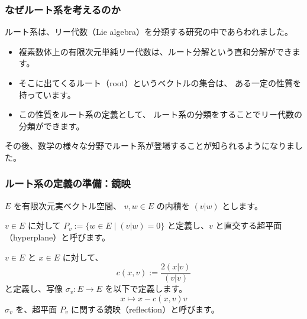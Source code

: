\documentclass{beamer}
\begin{document}
\begin{frame}
    \frametitle{なぜルート系を考えるのか}

    ルート系は、リー代数（Lie algebra）を分類する研究の中であらわれました。

    \begin{itemize}
        \item 複素数体上の有限次元単純リー代数は、ルート分解という直和分解ができます。
        \item そこに出てくるルート（root）というベクトルの集合は、
              ある一定の性質を持っています。
        \item この性質をルート系の定義として、
              ルート系の分類をすることでリー代数の分類ができます。
    \end{itemize}

    その後、数学の様々な分野でルート系が登場することが知られるようになりました。
\end{frame}

\begin{frame}
    \frametitle{ルート系の定義の準備：鏡映}

    \(E\) を有限次元実ベクトル空間、
    \(v, w \in E\) の内積を \((v|w)\) とします。

    \begin{definition}[超平面]
        \(v \in E\) に対して
        \(P_v := \{ w \in E \mid (v|w) = 0 \} \)
        と定義し、\(v\) と直交する超平面（hyperplane）と呼びます。
    \end{definition}

    \begin{definition}[鏡映]
        \(v \in E\) と \(x \in E\) に対して、
        \[c(x,v) := \frac{2(x|v)}{(v|v)}\]
        と定義し、写像 \(\sigma_v : E \to E\) を以下で定義します。
        \[x \mapsto x - c(x,v) v\]
        \(\sigma_v\) を、超平面 \(P_v\) に関する鏡映（reflection）と呼びます。
    \end{definition}
\end{frame}
\end{document}
